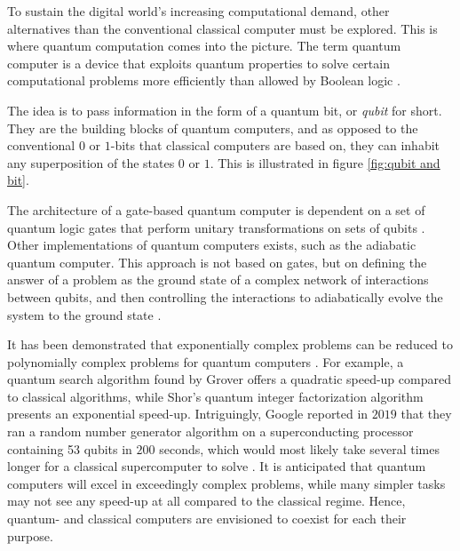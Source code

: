 To sustain the digital world's increasing computational demand, other alternatives than the conventional classical computer must be explored. This is where quantum computation comes into the picture. The term quantum computer is a device that exploits quantum properties to solve certain computational problems more efficiently than allowed by Boolean logic \cite{Weber2010}.

The idea is to pass information in the form of a quantum bit, or \textit{qubit} for short. They are the building blocks of quantum computers, and as opposed to the conventional $0$ or $1$-bits that classical computers are based on, they can inhabit any superposition of the states $0$ or $1$. This is illustrated in figure \ref{fig:qubit and bit}.


The architecture of a gate-based quantum computer is dependent on a set of quantum logic gates that perform unitary transformations on sets of qubits \cite{DiVincenzo2000, Ladd2010}. Other implementations of quantum computers exists, such as the adiabatic quantum computer. This approach is not based on gates, but on defining the answer of a problem as the ground state of a complex network of interactions between qubits, and then controlling the interactions to adiabatically evolve the system to the ground state \cite{Mizel2007}.



It has been demonstrated that exponentially complex problems can be reduced to polynomially complex problems for quantum computers \cite{Pavicic2006}. For example, a quantum search algorithm found by Grover \cite{Grover1997} offers a quadratic speed-up compared to classical algorithms, while Shor's quantum integer factorization algorithm \cite{Shor1994} presents an exponential speed-up. Intriguingly, Google reported in $2019$ that they ran a random number generator algorithm on a superconducting processor containing 53 qubits in $200$ seconds, which would most likely take several times longer for a classical supercomputer to solve \cite{Martinis2019}. It is anticipated that quantum computers will excel in exceedingly complex problems, while many simpler tasks may not see any speed-up at all compared to the classical regime. Hence, quantum- and classical computers are envisioned to coexist for each their purpose.

